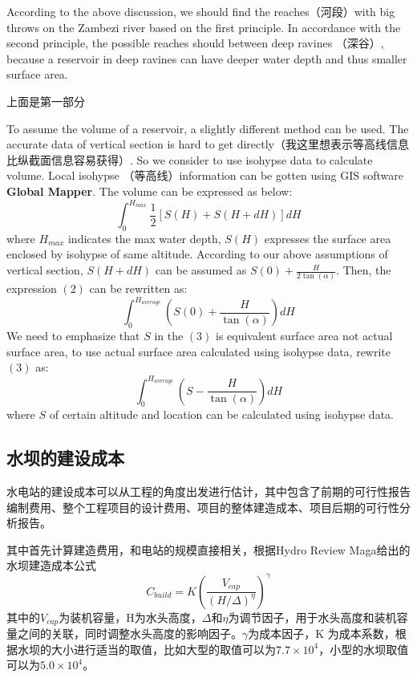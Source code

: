 \documentclass[nocover]{cumcmart}
\begin{document}
According to the above discussion, we should find the reaches（河段）with big throws on the Zambezi river based on the first principle. In accordance with the second principle, the possible reaches should between deep ravines （深谷）, because a reservoir in deep ravines can have deeper water depth and thus smaller surface area.

上面是第一部分

To assume the volume of a reservoir, a slightly different method can be used. The accurate data of vertical section is hard to get directly（我这里想表示等高线信息比纵截面信息容易获得）. So we consider to use isohypse data to calculate volume. Local isohypse （等高线）information can be gotten using GIS software \textbf{Global Mapper}. The volume can be expressed as below:
\begin{equation}\int_{0}^{H_{max}}\frac{1}{2}\left[S\left(H\right) + S\left(H + dH\right)\right]dH\end{equation}
where $H_{max}$ indicates the max water depth, $S\left(H\right)$ expresses the surface area enclosed by isohypse of same altitude. According to our above assumptions of vertical section, $S\left(H + dH\right)$ can be assumed as $S\left(0\right) + \frac{H}{2\tan\left(\alpha\right)}$. Then, the expression $\left(2\right)$ can be rewritten as:
\begin{equation}\int_{0}^{H_{average}}\left(S(0) + \frac{H}{\tan\left(\alpha\right)}\right)dH\end{equation}
We need to emphasize that $S$ in the $\left(3\right)$ is equivalent surface area not actual surface area, to use actual surface area calculated using isohypse data, rewrite $\left(3\right)$ as:
\begin{equation}\int_{0}^{H_{average}}\left(S - \frac{H}{\tan\left(\alpha\right)}\right)dH
\end{equation}
where $S$ of certain altitude and location can be calculated using isohypse data.

\newpage

\subsection{水坝的建设成本}
水电站的建设成本可以从工程的角度出发进行估计，其中包含了前期的可行性报告编制费用、整个工程项目的设计费用、项目的整体建造成本、项目后期的可行性分析报告。

其中首先计算建造费用，和电站的规模直接相关，根据Hydro Review Maga给出的水坝建造成本公式
\begin{equation}
C_{build} = K(\frac{V_{cap}}{(H/\Delta)^{\eta}})^{\gamma}
\end{equation}
其中的$V_{cap}$为装机容量，H为水头高度，$\Delta$和$\eta$为调节因子，用于水头高度和装机容量之间的关联，同时调整水头高度的影响因子。$\gamma$为成本因子，K 为成本系数，根据水坝的大小进行适当的取值，比如大型的取值可以为$7.7\times10^4$，小型的水坝取值可以为$5.0 \times 10^4$。
\end{document}
